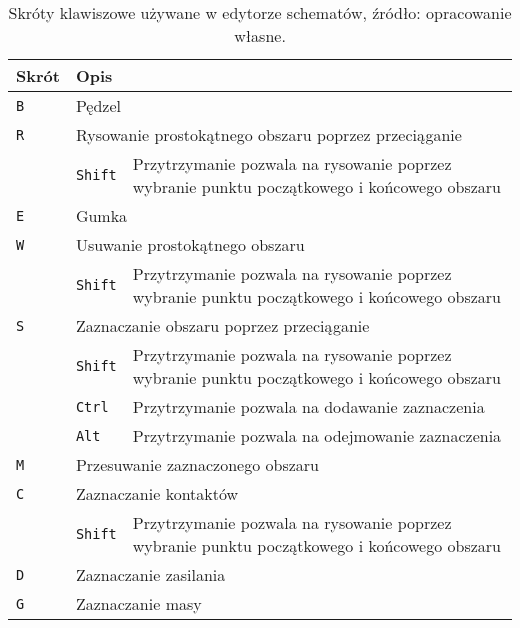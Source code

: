 \begin{table}[h]
    \centering
    \caption[Skróty klawiszowe używane w edytorze schematów.]
    {Skróty klawiszowe używane w edytorze schematów, źródło: opracowanie własne.}
    \label{tab:key_shortcuts}
    \begin{tabular}{|l||l|p{}|}
        \hline
        Skrót & \multicolumn{2}{|l|}{Opis} \\
        \hline
        \hline
        \texttt{B} & \multicolumn{2}{|l|}{Pędzel} \\
        \hline
        \texttt{R} & \multicolumn{2}{|l|}{Rysowanie prostokątnego obszaru poprzez przeciąganie} \\
        \cline{2-3}
        & \texttt{Shift} & Przytrzymanie pozwala na rysowanie poprzez wybranie punktu początkowego i końcowego obszaru \\
        \hline
        \texttt{E} & \multicolumn{2}{|l|}{Gumka} \\
        \hline
        \texttt{W} & \multicolumn{2}{|l|}{Usuwanie prostokątnego obszaru} \\
        \cline{2-3}
        & \texttt{Shift} & Przytrzymanie pozwala na rysowanie poprzez wybranie punktu początkowego i końcowego obszaru \\
        \hline
        \texttt{S} & \multicolumn{2}{|l|}{Zaznaczanie obszaru poprzez przeciąganie} \\
        \cline{2-3}
        & \texttt{Shift} & Przytrzymanie pozwala na rysowanie poprzez wybranie punktu początkowego i końcowego obszaru \\
        \cline{2-3}
        & \texttt{Ctrl} & Przytrzymanie pozwala na dodawanie zaznaczenia \\
        \cline{2-3}
        & \texttt{Alt} & Przytrzymanie pozwala na odejmowanie zaznaczenia \\
        \hline
        \texttt{M} & \multicolumn{2}{|l|}{Przesuwanie zaznaczonego obszaru} \\
        \hline
        \texttt{C} & \multicolumn{2}{|l|}{Zaznaczanie kontaktów} \\
        \cline{2-3}
        & \texttt{Shift} & Przytrzymanie pozwala na rysowanie poprzez wybranie punktu początkowego i końcowego obszaru \\
        \hline
        \texttt{D} & \multicolumn{2}{|l|}{Zaznaczanie zasilania} \\
        \hline
        \texttt{G} & \multicolumn{2}{|l|}{Zaznaczanie masy} \\
        \hline

\end{tabular}
\end{table}
